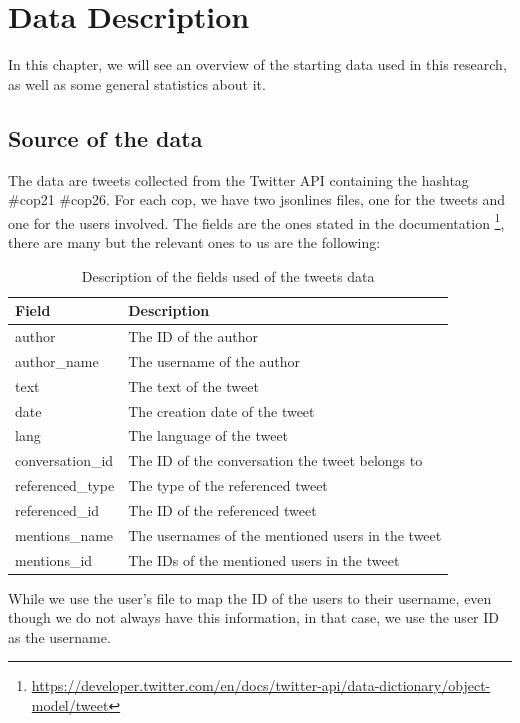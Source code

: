 
\chapter{Data Description}%
\label{ch:data}
In this chapter, we will see an overview of the starting data used in this research, as well as some general statistics about it.

\section{Source of the data}
The data are tweets collected from the Twitter API containing the hashtag \#cop21 \#cop26. 
For each cop, we have two jsonlines files, one for the tweets and one for the users involved. The fields are the ones stated in the documentation \footnote{ \href{https://developer.twitter.com/en/docs/twitter-api/data-dictionary/object-model/tweet}{https://developer.twitter.com/en/docs/twitter-api/data-dictionary/object-model/tweet}}, there are many but the relevant ones to us are the following: 

\begin{table}[H]
\centering
\begin{tabular}{|l|l|}
\hline
\textbf{Field} & \textbf{Description} \\ \hline
author & The ID of the author \\ \hline
author\_name & The username of the author \\ \hline
text & The text of the tweet \\ \hline
date & The creation date of the tweet \\ \hline
lang & The language of the tweet \\ \hline
conversation\_id & The ID of the conversation the tweet belongs to \\ \hline
referenced\_type & The type of the referenced tweet \\ \hline
referenced\_id & The ID of the referenced tweet \\ \hline
mentions\_name & The usernames of the mentioned users in the tweet \\ \hline
mentions\_id & The IDs of the mentioned users in the tweet \\ \hline

\end{tabular}
\caption{Description of the fields used of the tweets data}
\label{tab:my_label}
\end{table}
While we use the user's file to map the ID of the users to their username, even though we do not always have this information, in that case, we use the user ID as the username.

